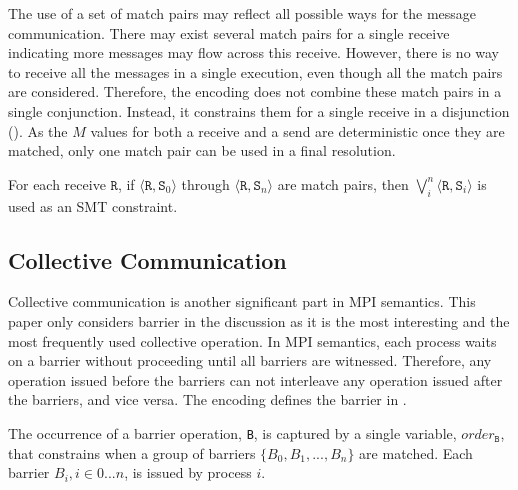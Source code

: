 The use of a set of match pairs may reflect all possible ways for the message communication. There may exist several match pairs for a single receive indicating more messages may flow across this receive. However, there is no way to receive all the messages in a single execution, even though all the match pairs are considered. Therefore, the encoding does not combine these match pairs in a single conjunction. Instead, it constrains them for a single receive in a disjunction (). As the $M$ values for both a receive and a send are deterministic once they are matched, only one match pair can be used in a final resolution.

\begin{definition} \label{def:receive_match}
For each receive $\mathtt{R}$, if $\langle\mathtt{R},
\mathtt{S}_0\rangle$ through $\langle\mathtt{R}, \mathtt{S}_n\rangle$
are match pairs, then $\bigvee_{i}^{n} \langle\mathtt{R},
\mathtt{S}_i\rangle$ is used as an SMT constraint.
\end{definition}


\subsection{Collective Communication}
Collective communication is another significant part in MPI semantics. 
This paper only considers barrier in the discussion as it is the most interesting and the most frequently used collective operation. In MPI semantics, each process waits on a barrier without proceeding until all barriers are witnessed. Therefore, any operation issued before the barriers can not interleave any operation issued after the barriers, and vice versa. The encoding defines the barrier in . 

\begin{definition}[Barrier]\label{def:barrier}
The occurrence of a barrier operation, \texttt{B}, is captured by a
single variable, $\mathit{order}_\mathtt{B}$, that constrains when a group of barriers $\{B_0, B_1, ..., B_n\}$ are matched.  
Each barrier $B_i, i\in{0 ... n}$, is issued by process $i$. 
\end{definition}

